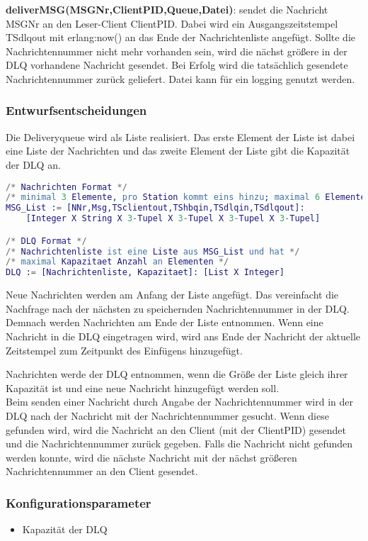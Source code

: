 \documentclass{article}
\begin{document}
\textbf{deliverMSG(MSGNr,ClientPID,Queue,Datei)}: sendet die Nachricht MSGNr an den Leser-Client ClientPID. Dabei wird ein Ausgangszeitstempel TSdlqout mit erlang:now() an das Ende der Nachrichtenliste angefügt. Sollte die Nachrichtennummer nicht mehr vorhanden sein, wird die nächst größere in der DLQ vorhandene Nachricht gesendet. Bei Erfolg wird die tatsächlich gesendete Nachrichtennummer zurück geliefert. Datei kann für ein logging genutzt werden.\\

\subsubsection{Entwurfsentscheidungen}
Die Deliveryqueue wird als Liste realisiert. Das erste Element der Liste ist dabei eine Liste der Nachrichten und das zweite Element der Liste gibt die Kapazität der DLQ an.
\begin{lstlisting}[language=erlang]
/* Nachrichten Format */
/* minimal 3 Elemente, pro Station kommt eins hinzu; maximal 6 Elemente */
MSG_List := [NNr,Msg,TSclientout,TShbqin,TSdlqin,TSdlqout]:
    [Integer X String X 3-Tupel X 3-Tupel X 3-Tupel X 3-Tupel]

/* DLQ Format */
/* Nachrichtenliste ist eine Liste aus MSG_List und hat */
/* maximal Kapazitaet Anzahl an Elementen */
DLQ := [Nachrichtenliste, Kapazitaet]: [List X Integer]
\end{lstlisting}

Neue Nachrichten werden am Anfang der Liste angefügt. Das vereinfacht die Nachfrage nach der nächsten zu speichernden Nachrichtennummer in der DLQ. Demnach werden Nachrichten am Ende der Liste entnommen. Wenn eine Nachricht in die DLQ eingetragen wird, wird ans Ende der Nachricht der aktuelle Zeitstempel zum Zeitpunkt des Einfügens hinzugefügt.

Nachrichten werde der DLQ entnommen, wenn die Größe der Liste gleich ihrer Kapazität ist und eine neue Nachricht hinzugefügt werden soll.\\

Beim senden einer Nachricht durch Angabe der Nachrichtennummer wird in der DLQ nach der Nachricht mit der Nachrichtennummer gesucht. Wenn diese gefunden wird, wird die Nachricht an den Client (mit der ClientPID) gesendet und die Nachrichtennummer zurück gegeben. Falls die Nachricht nicht gefunden werden konnte, wird die nächste Nachricht mit der nächst größeren Nachrichtennummer an den Client gesendet.

\subsubsection{Konfigurationsparameter}
\begin{itemize}
    \item Kapazität der DLQ
\end{itemize}
\end{document}
